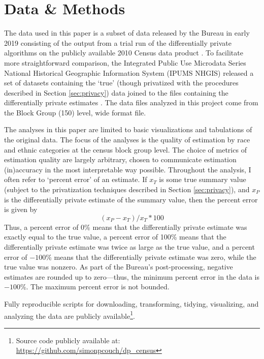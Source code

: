 \section{Data \& Methods}\label{sec:methods}

The data used in this paper is a subset of data released by the Bureau in early 2019 consisting of the output from a trial run of the differentially private algorithms on the publicly available 2010 Census data product \cite{bureau_2010_2019}. To facilitate more straightforward comparison, the Integrated Public Use Microdata Series National Historical Geographic Information System (IPUMS NHGIS) released a set of datasets containing the `true' (though privatized with the procedures described in Section \ref{sec:privacy}) data joined to the files containing the differentially private estimates \cite{manson_differentially_2019}. The data files analyzed in this project come from the Block Group (150) level, wide format file.

The analyses in this paper are limited to basic visualizations and tabulations of the original data. The focus of the analyses is the quality of estimation by race and ethnic categories at the census block group level. The choice of metrics of estimation quality are largely arbitrary, chosen to communicate estimation (in)accuracy in the most interpretable way possible. Throughout the analysis, I often refer to `percent error' of an estimate. If $x_{T}$ is some true summary value (subject to the privatization techniques described in Section \ref{sec:privacy}), and $x_{P}$ is the differentially private estimate of the summary value, then the percent error is given by $$(x_P - x_T) / x_T * 100$$ Thus, a percent error of 0\% means that the differentially private estimate was exactly equal to the true value, a percent error of 100\% means that the differentially private estimate was twice as large as the true value, and a percent error of $-100$\% means that the differentially private estimate was zero, while the true value was nonzero. As part of the Bureau's post-processing, negative estimates are rounded up to zero---thus, the minimum percent error in the data is $-100$\%. The maximum percent error is not bounded.

Fully reproducible scripts for downloading, transforming, tidying, visualizing, and analyzing the data are publicly available\footnote{Source code publicly available at: \url{https://github.com/simonpcouch/dp_census}}. 








